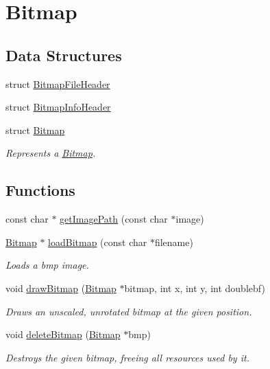 \hypertarget{group___bitmap}{}\section{Bitmap}
\label{group___bitmap}
\subsection*{Data Structures}
\begin{DoxyCompactItemize}
\item 
struct \hyperlink{struct_bitmap_file_header}{Bitmap\+File\+Header}
\item 
struct \hyperlink{struct_bitmap_info_header}{Bitmap\+Info\+Header}
\item 
struct \hyperlink{struct_bitmap}{Bitmap}
\begin{DoxyCompactList}\small\item\em Represents a \hyperlink{struct_bitmap}{Bitmap}. \end{DoxyCompactList}\end{DoxyCompactItemize}
\subsection*{Functions}
\begin{DoxyCompactItemize}
\item 
const char $\ast$ \hyperlink{group___bitmap_ga0dd46e75260201b6cd8211299bf9e703}{get\+Image\+Path} (const char $\ast$image)
\item 
\hyperlink{struct_bitmap}{Bitmap} $\ast$ \hyperlink{group___bitmap_ga3506880ffd407c36eb8aaddd2c1606d2}{load\+Bitmap} (const char $\ast$filename)
\begin{DoxyCompactList}\small\item\em Loads a bmp image. \end{DoxyCompactList}\item 
void \hyperlink{group___bitmap_gafe3e5be36ca808fa1383387b7943aa10}{draw\+Bitmap} (\hyperlink{struct_bitmap}{Bitmap} $\ast$bitmap, int x, int y, int doublebf)
\begin{DoxyCompactList}\small\item\em Draws an unscaled, unrotated bitmap at the given position. \end{DoxyCompactList}\item 
void \hyperlink{group___bitmap_ga08c1d4f4fff81df260d979ea8fc1aa61}{delete\+Bitmap} (\hyperlink{struct_bitmap}{Bitmap} $\ast$bmp)
\begin{DoxyCompactList}\small\item\em Destroys the given bitmap, freeing all resources used by it. \end{DoxyCompactList}\end{DoxyCompactItemize}


